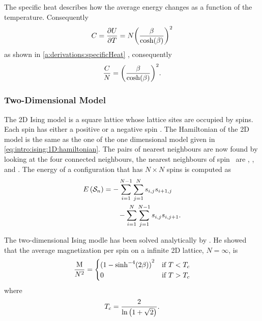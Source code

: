 	The specific heat describes how the average energy changes as a function of the temperature. Consequently
	\begin{equation*}
		C = \frac{\partial U}{\partial T} = N {\left(\frac{\beta}{\cosh(\beta)}\right)}^{2}
	\end{equation*}
	as shown in \cref{a:derivations:specificHeat} \cite{warkHandout}, consequently
	\begin{equation*}
	 	\frac{C}{N} = {\left(\frac{\beta}{\cosh(\beta)}\right)}^2.
	 \end{equation*}
 
\subsubsection{Two-Dimensional Model}
	\label{sss:intro:ising:2D}
	The 2D Ising model is a square lattice whose lattice sites are occupied by spins. Each spin has either a positive or a negative spin \cite{kenzel1997physics}. The Hamiltonian of the 2D model is the same as the one of the one dimensional model given in \cref{eq:intro:ising:1D:hamiltonian}. The pairs of nearest neighbours are now found by looking at the four connected neighbours, \ie the nearest neighbours of \mbox{spin } are , ,  and . The energy of a configuration  that has $N \times N$ spins is computed as
	\begin{equation}
		\label{eq:intro:ising:2d:energy}
		\begin{split}
		E\left(\mathcal{S}_{n} \right) 
			& = - \sum_{i = 1}^{N - 1}\sum_{j = 1}^{N} s_{i,j}s_{i+1,j}\\
			&\quad\quad - \sum_{i = 1}^{N}\sum_{j = 1}^{N - 1} s_{i,j} s_{i, j+1}.
		\end{split}
	\end{equation}

	The two-dimensional Ising modle has been solved analytically by \textcite{onsager1944crystal}. He showed that the average magnetization per spin on a infinite 2D lattice, \ie $N = \infty$, is
	\begin{equation*}
		\frac{\mathrm{M}}{N^2} = \begin{cases}
			{(1 - {\sinh}^{-4}(2\beta))}^2 & \text{if } T < T_{c}\\
			0 								& \text{if } T > T_{c}
		\end{cases}
	\end{equation*}
	where
	\begin{equation*}
		T_{c} = \frac{2}{\ln \left(1 + \sqrt{2}\right)}.
	\end{equation*}

